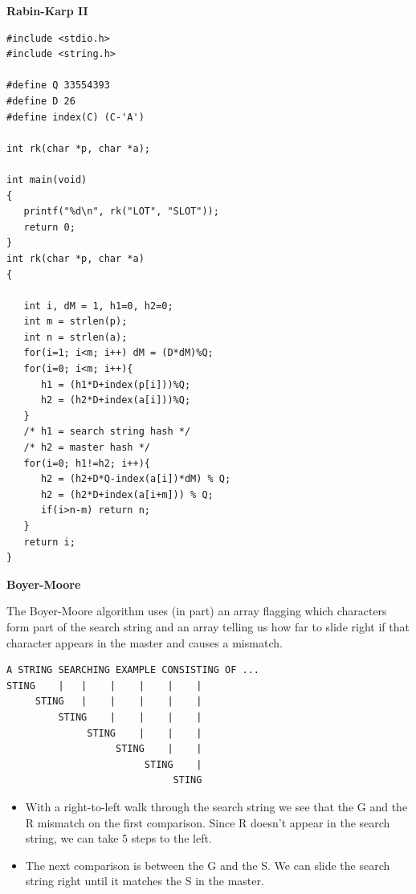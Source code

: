 \newpage
{\samepage
\begin{center}
{\Large{\bf Rabin-Karp II}}
\end{center}
{\small
\begin{verbatim}
#include <stdio.h>
#include <string.h>

#define Q 33554393
#define D 26
#define index(C) (C-'A')

int rk(char *p, char *a);

int main(void)
{
   printf("%d\n", rk("LOT", "SLOT"));
   return 0;
}
int rk(char *p, char *a)
{

   int i, dM = 1, h1=0, h2=0;
   int m = strlen(p);
   int n = strlen(a);
   for(i=1; i<m; i++) dM = (D*dM)%Q;
   for(i=0; i<m; i++){
      h1 = (h1*D+index(p[i]))%Q;
      h2 = (h2*D+index(a[i]))%Q;
   }
   /* h1 = search string hash */
   /* h2 = master hash */
   for(i=0; h1!=h2; i++){
      h2 = (h2+D*Q-index(a[i])*dM) % Q;
      h2 = (h2*D+index(a[i+m])) % Q;
      if(i>n-m) return n;
   }
   return i;
}
\end{verbatim}
}}

\newpage
{\samepage
\begin{center}
{\Large{\bf Boyer-Moore}}
\end{center}

The Boyer-Moore algorithm uses (in part) an array flagging
which characters form part of the search string and an array telling
us how far to slide right if that character appears in the master and causes
a mismatch.
{\small
\begin{verbatim}
A STRING SEARCHING EXAMPLE CONSISTING OF ...
STING    |   |    |    |    |    |
     STING   |    |    |    |    |
         STING    |    |    |    |
              STING    |    |    |
                   STING    |    |
                        STING    |
                             STING
\end{verbatim}
}
\begin{itemize}
\item With a right-to-left walk through the search string we see that
the G and the R mismatch on the first comparison. Since R doesn't appear in the
search string, we can take $5$ steps to the left.
\item The next comparison is between the G and the S. We can slide the search string right until it matches the S in the master.
\end{itemize}
}

